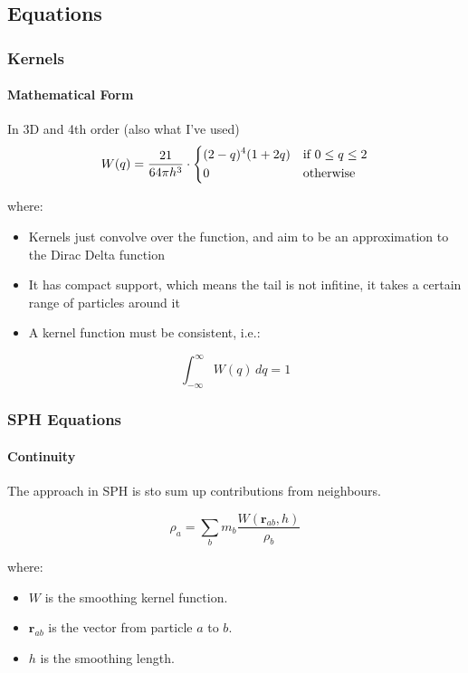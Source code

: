 \documentclass[notheorems, aspectratio=169]{beamer}
\begin{document}
  \subsection{Equations}

  \begin{frame}
    \frametitle{Kernels}
    \framesubtitle{Mathematical Form}

    In 3D and 4th order (also what I've used)
    \begin{equation}
      W(q) = \frac{21}{64\pi h^3} \cdot
      \begin{dcases}
        (2 - q)^4 (1 + 2q) & \text{if } 0 \leq q \leq 2 \\
        0 & \text{otherwise}
      \end{dcases}
      \end{equation}
    
    where:
    \begin{itemize}
      \item Kernels just convolve over the function, and aim to be an approximation to the Dirac Delta function
      \item It has compact support, which means the tail is not infitine, it takes a certain range of particles around it
      \item A kernel function must be consistent, i.e.:
    \end{itemize}

    \begin{equation}
      \int_{-\infty}^{\infty} W(q) \, dq = 1
      \end{equation}
    
    \end{frame}
    



  \begin{frame}[fragile]
  \frametitle{SPH Equations}
  \framesubtitle{Continuity}
  
  The approach in SPH is sto sum up contributions from neighbours.
  
  \begin{equation}
  \rho_a = \sum_{b} m_b \frac{W(\mathbf{r}_{ab}, h)}{\rho_b}
  \end{equation}
  
  
  where:
  \begin{itemize}
    \item \( W \) is the smoothing kernel function.
    \item \( \mathbf{r}_{ab} \) is the vector from particle \( a \) to \( b \).
    \item \( h \) is the smoothing length.
  \end{itemize}
  
  \end{frame}
\end{document}
